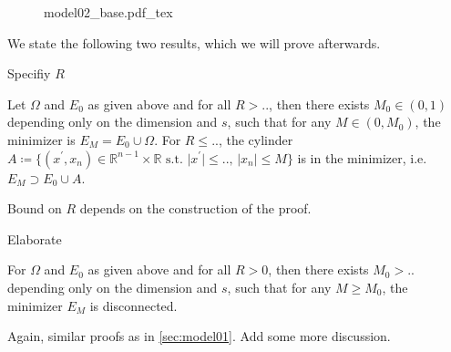 \begin{figure}[h]
	\centering
	\def\svgwidth{0.5\textwidth}
	{model02_base.pdf_tex}
	\caption{}
	\label{fig:104}
\end{figure}

We state the following two results, which we will prove afterwards.

\begin{TODO}
	Specifiy \( R \)
\end{TODO}
\begin{theorem}
	\label{thm:103}
	Let \( \Omega \) and \( E_0 \) as given above and for all \( R >.. \), then there
	exists \( M_0 \in (0,1) \) depending only on the dimension and \( s \), such that
	for any \( M \in (0, M_0) \), the minimizer is \( E_M = E_0 \cup \Omega \). For \( R
	\leq.. \), the cylinder \( A \coloneqq \{(x^\prime,x_n) \in \mathbb{R}^{n-1} \times
	\mathbb{R} \text{ s.t.~} \lvert x^\prime \rvert \leq.., \, \lvert x_n \rvert \leq M
	\} \) is in the minimizer, i.e.\ \( E_M \supset E_0 \cup A \).
\end{theorem}
\begin{note}
	Bound on \( R \) depends on the construction of the proof.
	\begin{TODO}
		Elaborate
	\end{TODO}
\end{note}

\begin{theorem}
	\label{thm:104}
	For \( \Omega \) and \( E_0 \) as given above and for all \( R > 0 \), then there
	exists \( M_0 >.. \) depending only on the dimension and \( s \), such that
	for any \( M \geq M_0 \), the minimizer \( E_M \) is disconnected.
\end{theorem}

Again, similar proofs as in \cref{sec:model01}.\newline
Add some more discussion.

